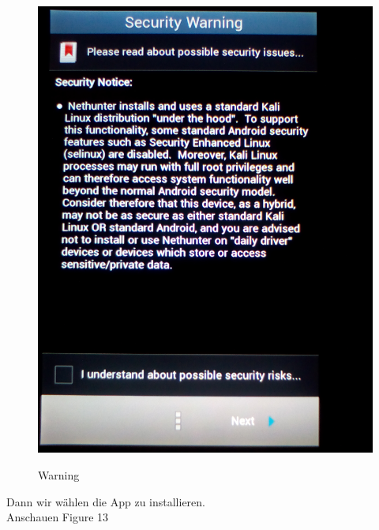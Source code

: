 \documentclass[11pt,a4paper]{article}
\begin{document}
\begin{figure}[H]
\begin{center} \includegraphics[scale=0.1]{./Image/img12}  \\
\caption{Warning}
\end{center}
\end{figure} 

Dann wir wählen die App zu installieren. \\
Anschauen Figure 13 \\
\end{document}
